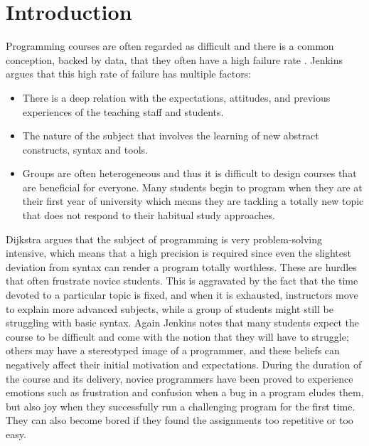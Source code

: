 \documentclass[a4paper,twoside]{article}
\begin{document}
\onecolumn \maketitle \normalsize \vfill

\section{Introduction}
Programming courses are often regarded as difficult
\cite{robins2003learning, lahtinen2005study,munson2018models}
and there is a common conception, backed by data, that they often have a high
failure rate \cite{bennedsen2007failure}.
Jenkins \cite{jenkins2001motivation} argues that this high rate of failure has
multiple factors:
\begin{itemize}
\item There is a deep relation with the expectations, attitudes,
and previous experiences of the teaching staff and students.
\item The nature of the subject that involves the
learning of new abstract constructs, syntax and tools.
\item Groups are often heterogeneous and thus it is difficult to design courses
that are beneficial for everyone. Many students begin to program when they
are at their first year of university which means they are tackling a totally
new topic that does not respond to their habitual study approaches.
\end{itemize}

Dijkstra \cite{dijkstra1989cruelty} argues that the subject of programming is
very problem-solving intensive, which means that a high precision is required
since even the slightest deviation from syntax can render a program
totally worthless. These are hurdles that often frustrate novice
students. This is aggravated by the fact that the time devoted to a
particular topic is fixed, and when it is exhausted, instructors move to explain
more advanced subjects, while a group of students might still be struggling with
basic syntax.
Again Jenkins \cite{jenkins2001motivation, jenkins2002difficulty} notes that
many students expect the course to be difficult and come with the notion that
they will have to struggle; others may have a stereotyped image of a programmer,
and these beliefs can negatively affect their initial motivation and expectations.
During the duration of the course and its delivery, novice programmers
have been proved to experience  emotions such as frustration and
confusion when a bug in a program eludes them, but also joy when they
successfully run a challenging program for the first time. They can also become
bored if they found the assignments too repetitive or too easy.
\end{document}
